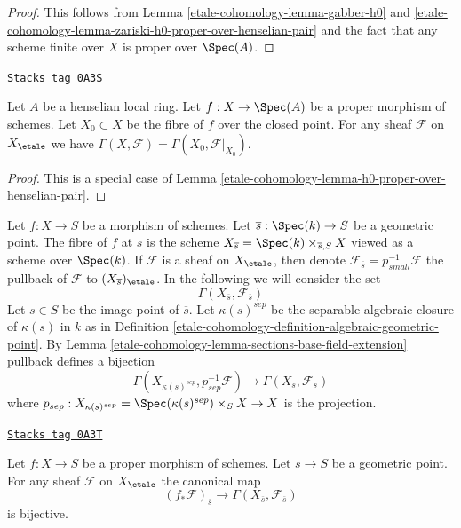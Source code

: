 \begin{proof}
This follows from Lemma \ref{etale-cohomology-lemma-gabber-h0} and
\ref{etale-cohomology-lemma-zariski-h0-proper-over-henselian-pair}
and the fact that any scheme finite over $X$ is proper over $\Spec(A)$.
\end{proof}

\begin{lemma}
\label{etale-cohomology-lemma-h0-proper-over-henselian-local}
\href{https://stacks.math.columbia.edu/tag/0A3S}{\texttt{Stacks tag 0A3S}}

Let $A$ be a henselian local ring. Let $f : X \to \Spec(A)$
be a proper morphism of schemes. Let $X_0 \subset X$ be the fibre of
$f$ over the closed point. For any sheaf $\mathcal{F}$ on $X_\etale$ we
have $\Gamma(X, \mathcal{F}) = \Gamma(X_0, \mathcal{F}|_{X_0})$.
\end{lemma}

\begin{proof}
This is a special case of Lemma \ref{etale-cohomology-lemma-h0-proper-over-henselian-pair}.
\end{proof}

Let $f : X \to S$ be a morphism of schemes. Let
$\overline{s} : \Spec(k) \to S$ be a geometric point. The fibre
of $f$ at $\overline{s}$ is the scheme
$X_{\overline{s}} = \Spec(k) \times_{\overline{s}, S} X$ viewed
as a scheme over $\Spec(k)$. If $\mathcal{F}$ is a sheaf on
$X_\etale$, then denote
$\mathcal{F}_{\overline{s}} = p_{small}^{-1}\mathcal{F}$
the pullback of $\mathcal{F}$ to $(X_{\overline{s}})_\etale$.
In the following we will consider the set
$$
\Gamma(X_{\overline{s}}, \mathcal{F}_{\overline{s}})
$$
Let $s \in S$ be the image point of $\overline{s}$. Let $\kappa(s)^{sep}$
be the separable algebraic closure of $\kappa(s)$ in $k$ as in
Definition \ref{etale-cohomology-definition-algebraic-geometric-point}.
By Lemma \ref{etale-cohomology-lemma-sections-base-field-extension}
pullback defines a bijection
$$
\Gamma(X_{\kappa(s)^{sep}},
p_{sep}^{-1} \mathcal{F})
\longrightarrow
\Gamma(X_{\overline{s}}, \mathcal{F}_{\overline{s}})
$$
where $p_{sep} : X_{\kappa(s)^{sep}} = \Spec(\kappa(s)^{sep}) \times_S X \to X$
is the projection.

\begin{lemma}
\label{etale-cohomology-lemma-proper-pushforward-stalk}
\href{https://stacks.math.columbia.edu/tag/0A3T}{\texttt{Stacks tag 0A3T}}

Let $f : X \to S$ be a proper morphism of schemes. Let
$\overline{s} \to S$ be a geometric point.
For any sheaf $\mathcal{F}$ on $X_\etale$
the canonical map
$$
(f_*\mathcal{F})_{\overline{s}} \longrightarrow
\Gamma(X_{\overline{s}}, \mathcal{F}_{\overline{s}})
$$
is bijective.
\end{lemma}

